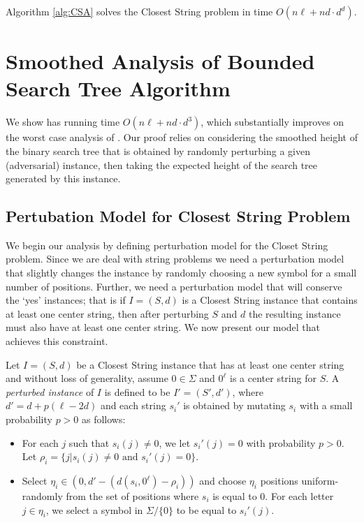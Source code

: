 \begin{theorem} \label{worst_case_theorem} \cite{GNR03} Algorithm \ref{alg:CSA} solves the {\sc Closest String} problem in time $O(n\ell + nd \cdot d^d)$. \end{theorem}


\section{Smoothed Analysis of Bounded Search Tree Algorithm} \label{smoothed_analysis_section}

We show has running time $O(n\ell + n d \cdot d^3)$, which substantially improves on the worst case analysis of \cite{GNR03}. Our proof relies on considering the smoothed height of the binary search tree that is obtained by randomly perturbing a given (adversarial) instance, then taking the expected height of the search tree generated by this instance.  

\subsection{Pertubation Model for {\sc Closest String} Problem} \label{perturb_model}

We begin our analysis by defining perturbation model for the {\sc Closet String} problem.  Since we are deal with string problems we need a perturbation model that slightly changes the instance by randomly choosing a new symbol for a small number of positions.  Further, we need a perturbation model that will conserve the `yes' instances; that is if $I = (S, d)$ is a {\sc Closest String} instance that contains at least one center string, then after perturbing $S$ and $d$ the resulting instance must also have at least one center string.  We now present our model that achieves this constraint.

Let $I = (S, d)$ be a {\sc Closest String} instance that has at least one center string and without loss of generality, assume $0 \in \Sigma$ and $0^{\ell}$ is a center string for $S$. A {\em perturbed instance}  of $I$ is defined to be  $I' = (S', d')$, where $d' = d  + p(\ell - 2d)$ and each string $s_i'$ is obtained by mutating $s_i$ with a small probability $p >0$ as follows: 

\begin{itemize}
\item For each $j$ such that $s_i(j) \ne 0$, we let $s_i'(j) = 0$ with probability $p > 0$. Let $\rho_i = \{j | s_i(j) \ne 0 \mbox{ and } s_i'(j) = 0\}$.
\item Select $\eta_i \in (0, d' - (d(s_i, 0^{\ell}) - \rho_i))$ and choose $\eta_i$ positions uniform-randomly from the set of positions where $s_i$ is equal to 0. For each letter $j \in \eta_i$, we select a symbol in $\Sigma / \{0\}$ to be equal to $s_i'(j)$.
 \end{itemize}

